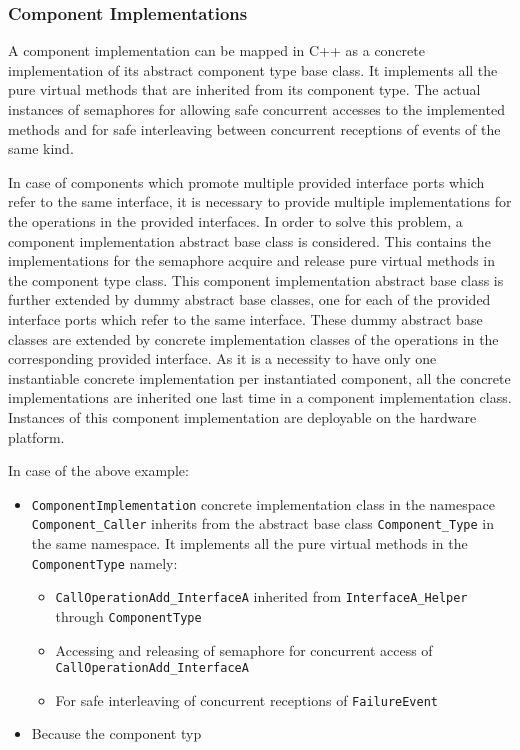 \subsubsection{\textbf{Component Implementations}}
A component implementation can be mapped in C++ as a concrete implementation of its abstract component type base class. It implements all the pure virtual methods that are inherited from its component type. The actual instances of semaphores for allowing safe concurrent accesses to the implemented methods and for safe interleaving between concurrent receptions of events of the same kind.

In case of components which promote multiple provided interface ports which refer to the same interface, it is necessary to provide multiple implementations for the operations in the provided interfaces. In order to solve this problem, a component implementation abstract base class is considered. This contains the implementations for the semaphore acquire and release pure virtual methods in the component type class. This component implementation abstract base class is further extended by dummy abstract base classes, one for each of the provided interface ports which refer to the same interface. These dummy abstract base classes are extended by concrete implementation classes of the operations in the corresponding provided interface. As it is a necessity to have only one instantiable concrete implementation per instantiated component, all the concrete implementations are inherited one last time in a component implementation class. Instances of this component implementation are deployable on the hardware platform.
 
In case of the above example:
\begin{itemize}
\item \texttt{ComponentImplementation} concrete implementation class in the namespace \texttt{Component\_Caller} inherits from the abstract base class \texttt{Component\_Type} in the same namespace. It implements all the pure virtual methods in the \texttt{ComponentType} namely:
\begin{itemize}
\item \texttt{CallOperationAdd\allowbreak\_InterfaceA} inherited from \texttt{InterfaceA\allowbreak\_Helper} through \texttt{ComponentType}
\item Accessing and releasing of semaphore for concurrent access of \texttt{CallOperationAdd\allowbreak\_InterfaceA}
\item For safe interleaving of concurrent receptions of \texttt{FailureEvent}  
\end{itemize}
\item Because the component typ 
\end{itemize} 

